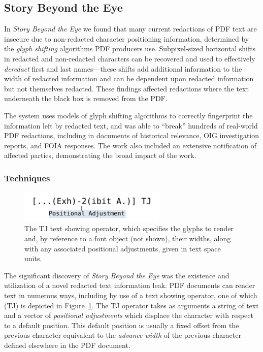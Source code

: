 \subsection{Story Beyond the Eye}

In \emph{Story Beyond the Eye} we found that many current redactions of PDF text are insecure due to non-redacted character positioning information, determined by the \emph{glyph shifting} algorithms PDF producers use.
Subpixel-sized horizontal shifts in redacted and non-redacted characters can be recovered and used to effectively \emph{deredact} first and last names---these shifts add additional information to the width of redacted information and can be dependent upon redacted information but not themselves redacted.
These findings affected redactions where the text underneath the black box is removed from the PDF.

The system uses models of glyph shifting algorithms to correctly fingerprint the information left by redacted text, and was able to ``break'' hundreds of real-world PDF redactions, including in documents of historical relevance, OIG investigation reports, and FOIA responses.
The work also included an extensive notification of affected parties, demonstrating the broad impact of the work.

\subsubsection{Techniques}

\begin{figure}[h!]
\centering
\includegraphics[width=2.75in]{tj.pdf}
    \caption{The TJ text showing operator, which specifies the glyphs to render and, by reference to a font object (not shown), their widths, along with any associated positional adjustments, given in text space units.}\label{fig:tj}
\end{figure}

The significant discovery of \emph{Story Beyond the Eye} was the existence and utilization of a novel redacted text information leak.
PDF documents can render text in numerous ways, including by use of a text showing operator, one of which (TJ) is depicted in Figure~\ref{fig:tj}. 
The TJ operator takes as arguments a string of text and a vector of \emph{positional adjustments} which displace the character with respect to a default position. 
This default position is usually a fixed offset from the previous character equivalent to the \emph{advance width} of the previous character defined elsewhere in the PDF document.

